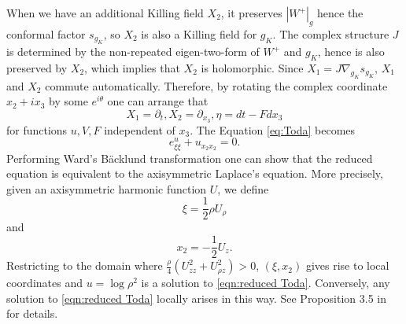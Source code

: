 \documentclass[a4paper,11pt]{amsart}
\theoremstyle{definition}
\numberwithin{equation}{section}
\begin{document}
When we have an additional Killing field $X_2$, it preserves $|W^+|_g$ hence the conformal factor $s_{g_K}$, so $X_2$ is also a Killing field for $g_K$. The complex structure $J$ is determined by the non-repeated eigen-two-form of $W^+$ and $g_K$, hence is also preserved by $X_2$, which implies that $X_2$ is holomorphic. Since $X_1=J\nabla_{g_K}s_{g_{K}}$, $X_1$ and $X_2$ commute automatically. Therefore, by rotating  the complex coordinate $x_2+ix_3$ by some $e^{i\theta}$ one can arrange that 
$$X_1=\partial_t, X_2=\partial_{x_3},  \eta=dt-Fdx_3$$ 
for functions $u, V, F$ independent of $x_3$. The Equation \eqref{eq:Toda} becomes
\begin{equation}\label{eqn:reduced Toda}
e^u_{\xi\xi}+u_{x_2x_2}=0.
\end{equation}Performing Ward's B\"acklund transformation \cite{Ward} one can show that the reduced equation is equivalent to the axisymmetric Laplace's equation. More precisely, given an axisymmetric harmonic function $U$, we define $$\xi=\frac12\rho U_{\rho}$$ and $$x_2=-\frac12U_z. $$Restricting to the domain where $\frac{\rho}{4}(U_{zz}^2+U_{\rho z}^2)>0$,  $(\xi,x_2)$ gives rise to local coordinates and $u=\log\rho^2$ is a solution to \eqref{eqn:reduced Toda}. Conversely, any solution to \eqref{eqn:reduced Toda} locally arises in this way. See Proposition 3.5 in \cite{BG} for details. 
\end{document}
